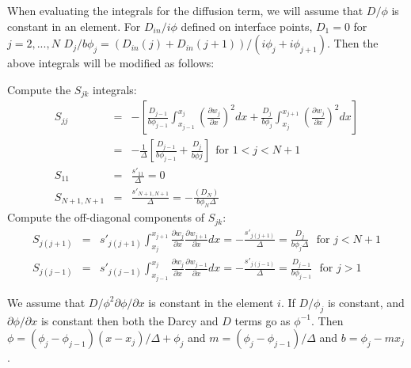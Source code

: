 When evaluating the integrals for the diffusion term, we will assume
that $D/\phi$ is constant in an element.  For $D_{in}/i\phi$ defined on interface
points, $D_1 = 0$
for $j = 2,...,N$
$D_j/b\phi_j = (D_{in}(j) + D_{in}(j+1))/(i\phi_j + i\phi_{j+1})$.  Then the above integrals will
be modified as follows:

Compute the $S_{jk}$ integrals:
\begin{eqnarray}
S_{jj} & = & - \left[\frac{D_{j-1}}{b\phi_{j-1}} \int_{x_{j-1}}^{x_j}\left( \frac{\partial
      w_j}{\partial x}\right)^2 dx + \frac{D_{j}}{b\phi_{j}} \int_{x_{j}}^{x_{j+1}}
  \left(\frac{\partial w_j}{\partial x}\right)^2 dx \right] \nonumber
\\
& = & -\frac{1}{\Delta}\left[\frac{D_{j-1}}{b\phi_{j-1}} + \frac{D_{j}}{b\phi{j}}\right]\ \ \mbox{for }1 < j < N+1 \nonumber \\
S_{11} & = & \frac{s'_{11}}{\Delta}  = 0 \nonumber \\
S_{N+1,N+1} & = & \frac{s'_{N+1,N+1}}{\Delta} = -\frac{(D_{N})}{b\phi_{N}\Delta}
\end{eqnarray}
Compute the off-diagonal components of $S_{jk}$:
\begin{eqnarray}
S_{j(j+1)} & = & s'_{j(j+1)}\int_{x_j}^{x_{j+1}}\frac{\partial
  w_j}{\partial x} \frac{\partial w_{j+1}}{\partial x} dx =
-\frac{s'_{j(j+1)}}{\Delta} =
\frac{D_{j}}{b\phi_{j}\Delta} \ \ \ \mbox{for } j < N+1
\nonumber \\
S_{j(j-1)} & = & s'_{j(j-1)}\int_{x_{j-1}}^{x_{j}}\frac{\partial
  w_j}{\partial x} \frac{\partial w_{j-1}}{\partial x} dx =
-\frac{s'_{j(j-1)}}{\Delta} =
\frac{D_{j-1}}{b\phi_{j-1}} \ \ \ \mbox{for } j > 1
\end{eqnarray}


We assume that $D/\phi^2 \partial \phi/\partial x$
is constant in the element $i$.  If $D/\phi_j$ is
constant, and $\partial \phi/\partial x$ is constant then both the
Darcy and $D$ terms go as $\phi^{-1}$.  Then  $\phi = (\phi_j -
\phi_{j-1})(x-x_j)/\Delta + \phi_j$  and $m = (\phi_j -
\phi_{j-1})/\Delta$ and $b = \phi_j - mx_j$.

